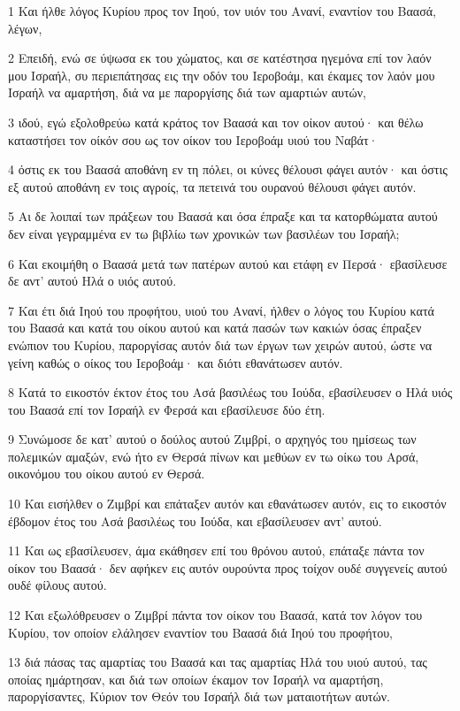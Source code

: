 \par 1 Και ήλθε λόγος Κυρίου προς τον Ιηού, τον υιόν του Ανανί, εναντίον του Βαασά, λέγων,
\par 2 Επειδή, ενώ σε ύψωσα εκ του χώματος, και σε κατέστησα ηγεμόνα επί τον λαόν μου Ισραήλ, συ περιεπάτησας εις την οδόν του Ιεροβοάμ, και έκαμες τον λαόν μου Ισραήλ να αμαρτήση, διά να με παροργίσης διά των αμαρτιών αυτών,
\par 3 ιδού, εγώ εξολοθρεύω κατά κράτος τον Βαασά και τον οίκον αυτού· και θέλω καταστήσει τον οίκόν σου ως τον οίκον του Ιεροβοάμ υιού του Ναβάτ·
\par 4 όστις εκ του Βαασά αποθάνη εν τη πόλει, οι κύνες θέλουσι φάγει αυτόν· και όστις εξ αυτού αποθάνη εν τοις αγροίς, τα πετεινά του ουρανού θέλουσι φάγει αυτόν.
\par 5 Αι δε λοιπαί των πράξεων του Βαασά και όσα έπραξε και τα κατορθώματα αυτού δεν είναι γεγραμμένα εν τω βιβλίω των χρονικών των βασιλέων του Ισραήλ;
\par 6 Και εκοιμήθη ο Βαασά μετά των πατέρων αυτού και ετάφη εν Περσά· εβασίλευσε δε αντ' αυτού Ηλά ο υιός αυτού.
\par 7 Και έτι διά Ιηού του προφήτου, υιού του Ανανί, ήλθεν ο λόγος του Κυρίου κατά του Βαασά και κατά του οίκου αυτού και κατά πασών των κακιών όσας έπραξεν ενώπιον του Κυρίου, παροργίσας αυτόν διά των έργων των χειρών αυτού, ώστε να γείνη καθώς ο οίκος του Ιεροβοάμ· και διότι εθανάτωσεν αυτόν.
\par 8 Κατά το εικοστόν έκτον έτος του Ασά βασιλέως του Ιούδα, εβασίλευσεν ο Ηλά υιός του Βαασά επί τον Ισραήλ εν Φερσά και εβασίλευσε δύο έτη.
\par 9 Συνώμοσε δε κατ' αυτού ο δούλος αυτού Ζιμβρί, ο αρχηγός του ημίσεως των πολεμικών αμαξών, ενώ ήτο εν Θερσά πίνων και μεθύων εν τω οίκω του Αρσά, οικονόμου του οίκου αυτού εν Θερσά.
\par 10 Και εισήλθεν ο Ζιμβρί και επάταξεν αυτόν και εθανάτωσεν αυτόν, εις το εικοστόν έβδομον έτος του Ασά βασιλέως του Ιούδα, και εβασίλευσεν αντ' αυτού.
\par 11 Και ως εβασίλευσεν, άμα εκάθησεν επί του θρόνου αυτού, επάταξε πάντα τον οίκον του Βαασά· δεν αφήκεν εις αυτόν ουρούντα προς τοίχον ουδέ συγγενείς αυτού ουδέ φίλους αυτού.
\par 12 Και εξωλόθρευσεν ο Ζιμβρί πάντα τον οίκον του Βαασά, κατά τον λόγον του Κυρίου, τον οποίον ελάλησεν εναντίον του Βαασά διά Ιηού του προφήτου,
\par 13 διά πάσας τας αμαρτίας του Βαασά και τας αμαρτίας Ηλά του υιού αυτού, τας οποίας ημάρτησαν, και διά των οποίων έκαμον τον Ισραήλ να αμαρτήση, παροργίσαντες, Κύριον τον Θεόν του Ισραήλ διά των ματαιοτήτων αυτών.
